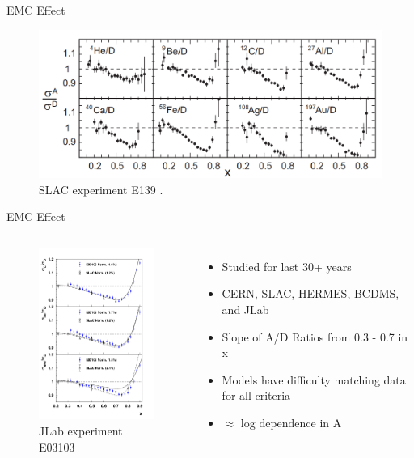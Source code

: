 \documentclass[12pt,usenames,dvipsnames]{beamer}
\begin{document}
\begin{frame}{EMC Effect}

\begin{figure}
\caption*{\label{EMC_slac} SLAC experiment E139 \cite{slac_emc} .}
\includegraphics[width =12cm]{../images/EMC_slac_horiz.png}
\end{figure}


\end{frame}

\begin{frame}{EMC Effect}
\begin{columns}
\vspace{-20pt}
\begin{figure}
\caption*{\label{E03103} JLab experiment E03103 \cite{E3103} }
\vspace{-20pt}
\includegraphics[width =5cm]{../images/carbon_be_he4}
\end{figure}
\hspace{10pt}
\begin{itemize}
		\item Studied for last 30+ years
		\item CERN, SLAC, HERMES, BCDMS, and JLab
		\item Slope of A/D Ratios from 0.3 - 0.7 in x
		\item Models have difficulty matching data for all criteria
		\item $\approx$ log dependence in A

\end{itemize}

\end{columns}
\end{frame}
\end{document}
